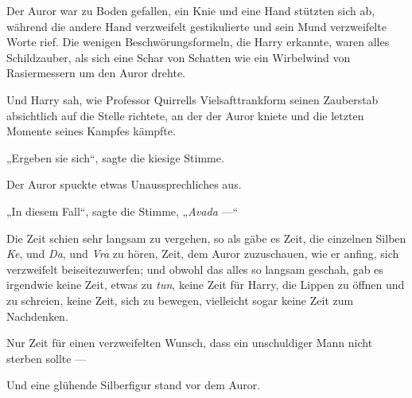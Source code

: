 Der Auror war zu Boden gefallen, ein Knie und eine Hand stützten sich ab, während die andere Hand verzweifelt gestikulierte und sein Mund verzweifelte Worte rief. Die wenigen Beschwörungsformeln, die Harry erkannte, waren alles Schildzauber, als sich eine Schar von Schatten wie ein Wirbelwind von Rasiermessern um den Auror drehte.

Und Harry sah, wie Professor Quirrells Vielsafttrankform seinen Zauberstab absichtlich auf die Stelle richtete, an der der Auror kniete und die letzten Momente seines Kampfes kämpfte.

„Ergeben sie sich“, sagte die kiesige Stimme.

Der Auror spuckte etwas Unaussprechliches aus.

„In diesem Fall“, sagte die Stimme,
„\emph{Avada} —“

Die Zeit schien sehr langsam zu vergehen, so als gäbe es Zeit, die einzelnen Silben \emph{Ke}, und \emph{Da}, und \emph{Vra} zu hören, Zeit, dem Auror zuzuschauen, wie er anfing, sich verzweifelt beiseitezuwerfen; und obwohl das alles so langsam geschah, gab es irgendwie keine Zeit, etwas zu \emph{tun}, keine Zeit für Harry, die Lippen zu öffnen und  zu schreien, keine Zeit, sich zu bewegen, vielleicht sogar keine Zeit zum Nachdenken.

Nur Zeit für einen verzweifelten Wunsch, dass ein unschuldiger Mann nicht sterben sollte —

Und eine glühende Silberfigur stand vor dem Auror.

